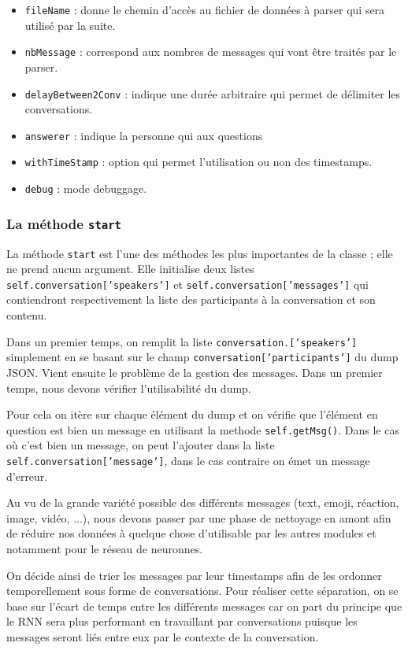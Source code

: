\documentclass[10pt,a4paper]{article}
\begin{document}
\begin{itemize}
	\item \texttt{fileName} : donne le chemin d'accès au fichier de données à parser qui sera utilisé par la suite.
	\item \texttt{nbMessage} : correspond aux nombres de messages qui vont être traités par le parser.
	\item \texttt{delayBetween2Conv} : indique une durée arbitraire qui permet de délimiter les conversations.
	\item \texttt{answerer} : indique la personne qui aux questions
	\item \texttt{withTimeStamp} : option qui permet l'utilisation ou non des timestamps.
	\item \texttt{debug} : mode debuggage.
\end{itemize}

\subsubsection{La méthode \texttt{start}}
La méthode \texttt{start} est l'une des méthodes les plus importantes de la classe ; elle ne prend aucun argument. Elle initialise deux listes \texttt{self.conversation['speakers']} et \texttt{self.conversation['messages']} qui contiendront respectivement la liste des participants à la conversation et son contenu.

Dans un premier temps, on remplit la liste \texttt{conversation.['speakers']} simplement en se basant sur le champ \texttt{conversation['participants']} du dump JSON. Vient ensuite le problème de la gestion des messages. Dans un premier temps, nous devons vérifier l'utilisabilité du dump.

Pour cela on itère sur chaque élément du dump et on vérifie que l'élément en question est bien un message en utilisant la methode \texttt{self.getMsg()}. Dans le cas où c'est bien un message, on peut l'ajouter dans la liste \texttt{self.conversation['message']}, dans le cas contraire on émet un message d'erreur.

Au vu de la grande variété possible des différents messages (text, emoji, réaction, image, vidéo, ...), nous devons passer par une phase de nettoyage en amont afin de réduire nos données à quelque chose d'utilisable par les autres modules et notamment pour le réseau de neuronnes.

On décide ainsi de trier les messages par leur timestamps afin de les ordonner temporellement sous forme de conversations. Pour réaliser cette séparation, on se base sur l'écart de temps entre les différents messages car on part du principe que le RNN sera plus performant en travaillant par conversations puisque les messages seront liés entre eux par le contexte de la conversation.
\end{document}
